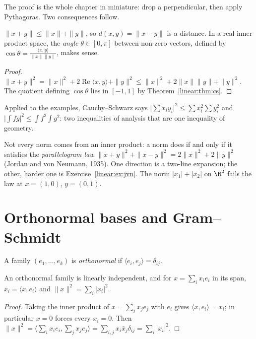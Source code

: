 The proof is the whole chapter in miniature: drop a perpendicular, then apply Pythagoras. Two consequences follow.

\begin{corollary}\label{linear:cor:triangle}
$\|x+y\|\le\|x\|+\|y\|$, so $d(x,y)=\|x-y\|$ is a distance. In a real inner product space, the \emph{angle}
$\theta\in[0,\pi]$ between non-zero vectors, defined by $\cos\theta=\frac{\langle x,y\rangle}{\|x\|\|y\|}$, makes sense.
\end{corollary}
\begin{proof}
$\|x+y\|^2=\|x\|^2+2\operatorname{Re}\langle x,y\rangle+\|y\|^2\le\|x\|^2+2\|x\|\|y\|+\|y\|^2$. The quotient defining
$\cos\theta$ lies in $[-1,1]$ by Theorem~\ref{linear:thm:cs}.
\end{proof}

Applied to the examples, Cauchy--Schwarz says $\bigl|\sum x_iy_i\bigr|^2\le\sum x_i^2\sum y_i^2$ and
$\bigl|\int fg\bigr|^2\le\int f^2\int g^2$: two inequalities of analysis that are one inequality of geometry.

\begin{remark}
Not every norm comes from an inner product: a norm does if and only if it satisfies the \emph{parallelogram law}
$\|x+y\|^2+\|x-y\|^2=2\|x\|^2+2\|y\|^2$ (Jordan and von Neumann, 1935). One direction is a two-line expansion; the other,
harder one is Exercise~\ref{linear:ex:jvn}. The norm $|x_1|+|x_2|$ on $\R^2$ fails the law at $x=(1,0)$, $y=(0,1)$.
\end{remark}

\section{Orthonormal bases and Gram--Schmidt}

A family $(e_1,\dots,e_k)$ is \emph{orthonormal} if $\langle e_i,e_j\rangle=\delta_{ij}$.

\begin{proposition}\label{linear:prop:orthfamily}
An orthonormal family is linearly independent, and for $x=\sum_i x_ie_i$ in its span, $x_i=\langle x,e_i\rangle$ and
$\|x\|^2=\sum_i|x_i|^2$.
\end{proposition}
\begin{proof}
Taking the inner product of $x=\sum_jx_je_j$ with $e_i$ gives $\langle x,e_i\rangle=x_i$; in particular $x=0$ forces
every $x_i=0$. Then $\|x\|^2=\langle\sum_ix_ie_i,\sum_jx_je_j\rangle=\sum_{i,j}x_i\bar x_j\delta_{ij}=\sum_i|x_i|^2$.
\end{proof}

